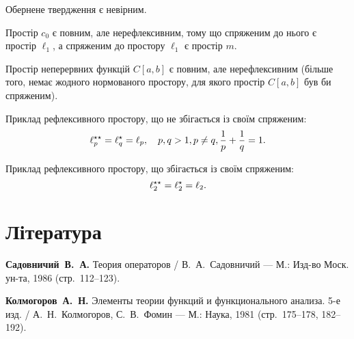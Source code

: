 \begin{remark}
Обернене твердження є невірним.
\end{remark}

\begin{example}
Простір $c_0$ є повним, але нерефлексивним,
тому що спряженим до нього є простір $\ell_1$, а спряженим до
простору $\ell_1$ є простір $m$.
\end{example}

\begin{example}
Простір неперервних функцій $C[a, b]$ є
повним, але нерефлексивним (більше того, немає жодного
нормованого простору, для якого простір $C[a, b]$ був би
спряженим).
\end{example}

\begin{example}
Приклад рефлексивного простору, що не
збігається із своїм спряженим:
\begin{equation*}
    \ell^{\star\star}_p = \ell^\star_q = \ell_p, \quad p, q > 1, p \ne q, \frac{1}{p} + \frac{1}{q} = 1.
\end{equation*}
\end{example}

\begin{example}
Приклад рефлексивного простору, що
збігається із своїм спряженим:
\begin{equation*}
    \ell_2^{\star\star} = \ell_2^\star = \ell_2.
\end{equation*}
\end{example}

\section{Література}

\begin{enumerate}[label={[\arabic*]}]
\item \textbf{Садовничий~В.~А.}
Теория операторов /
В.~А.~Садовничий ---
М.: Изд-во Моск. ун-та, 1986 (стр.~112--123).
\item \textbf{Колмогоров~А.~Н.}
Элементы теории функций и функционального анализа. 5-е изд. /
А.~Н.~Колмогоров, С.~В.~Фомин ---
М.: Наука, 1981 (стр.~175--178, 182--192).
\end{enumerate}
